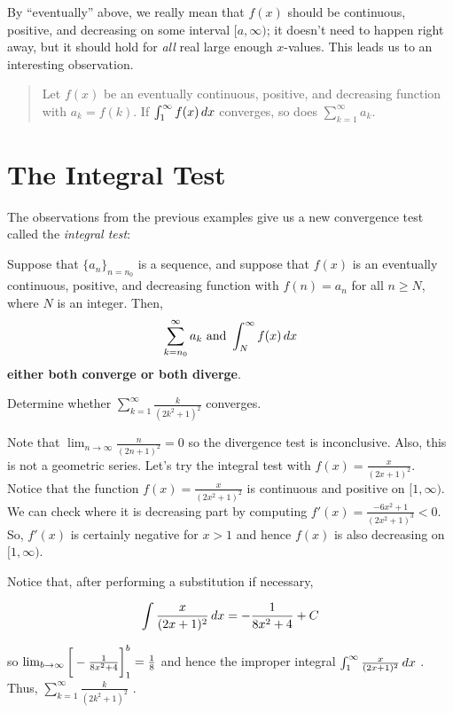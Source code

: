 \documentclass{ximera}
\begin{document}
By ``eventually'' above, we really mean that $f(x)$ should be continuous, positive, and decreasing on some interval $[a,\infty)$; it doesn't need to happen right away, but it should hold for \emph{all} real large enough $x$-values.  This leads us to an interesting observation.
\begin{quote}
  Let $f(x)$ be an eventually continuous, positive, and decreasing function with
    $a_k = f(k)$.  If $\int_1^\infty f(x) \mathop{}\!d x$ converges, so does
    $\sum_{k=1}^\infty a_k$.
\end{quote}

\section{The Integral Test}
The observations from the previous examples give us a new convergence test called the \textit{integral test}:
\begin{theorem}
   Suppose that $\{a_n\}_{n=n_0}$ is a sequence, and suppose that $f(x)$ is an eventually continuous, positive, and decreasing function
    with $f(n)=a_n$ for all $n \geq N$, where $N$ is an integer.  Then,
    \[
    \sum_{k=n_0}^\infty a_k\text{ and }\int_N^\infty f(x) \mathop{}\!d x
    \]
    \textbf{either both converge or both diverge}.
    \end{theorem}

\begin{example}
Determine whether $\sum_{k=1}^{\infty} \frac{k}{(2k^2+1)^2}$ converges.

\begin{explanation}
Note that $\lim_{n \to \infty}  \frac{n}{(2n+1)^2} =0$ so the divergence test is inconclusive.  Also, this is not a geometric series.  Let's try the integral test with $f(x) =  \frac{x}{(2x+1)^2}$.  Notice that the function $f(x) = \frac{x}{(2x^2+1)^2}$ is continuous and positive on $[1,\infty)$.  We can check where it is decreasing part by computing $f'(x) = \frac{-6x^2+1}{(2x^2+1)^3} < 0$.  So, $f'(x)$ is certainly negative for $x >1$ and hence $f(x)$ is also decreasing on $[1,\infty)$.

Notice that, after performing a substitution if necessary,

\[
\int \frac{x}{(2x+1)^2} \mathop{}\!d x = -\frac{1}{8x^2+4} +C
\]

so $\lim_{b \to \infty} \bigg[  -\frac{1}{8x^2+4} \bigg]_1^b = \frac{1}{8}$ and hence the improper integral $\int_1^{\infty}  \frac{x}{(2x+1)^2} \mathop{}\!d x $ .  Thus,  $\sum_{k=1}^{\infty} \frac{k}{(2k^2+1)^2}$ .

\end{explanation}

\end{example}
\end{document}

